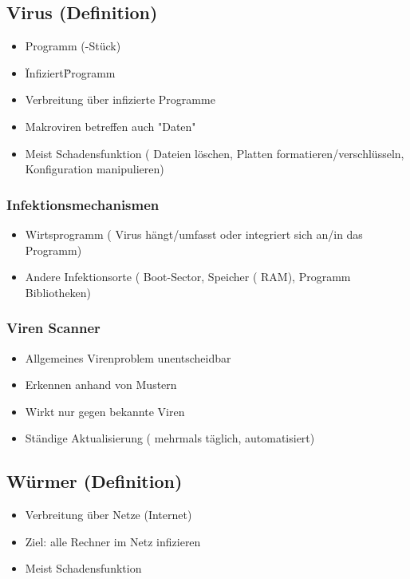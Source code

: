 	\subsection*{ Virus (Definition)}
	\begin{itemize}
		\item Programm (-Stück)
		\item \"Infiziert\" Programm
		\item Verbreitung über infizierte Programme
		\item Makroviren betreffen auch "Daten" 
		\item Meist Schadensfunktion ( Dateien löschen, Platten formatieren/verschlüsseln, Konfiguration manipulieren)
	\end{itemize}
	\subsubsection*{ Infektionsmechanismen}
	\begin{itemize}
		\item Wirtsprogramm ( Virus hängt/umfasst oder integriert sich an/in das Programm)
		\item Andere Infektionsorte ( Boot-Sector, Speicher ( RAM), Programm Bibliotheken)
	\end{itemize}
	
	\subsubsection*{ Viren Scanner}
	\begin{itemize}
		\item Allgemeines Virenproblem unentscheidbar
		\item Erkennen anhand von Mustern
		\item Wirkt nur gegen bekannte Viren
		\item Ständige Aktualisierung ( mehrmals täglich, automatisiert)
	\end{itemize}
	
	\subsection*{ Würmer (Definition)}
	\begin{itemize}
		\item Verbreitung über Netze (Internet)
		\item Ziel: alle Rechner im Netz infizieren
		\item Meist Schadensfunktion
	\end{itemize}

